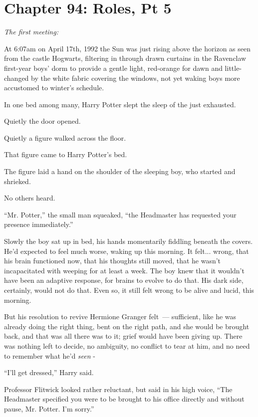 \chapter{Chapter 94: Roles, Pt 5}
\emph{The first meeting:}

At 6:07am on April 17th, 1992 the Sun was just rising above the horizon as seen from the castle Hogwarts, filtering in through drawn curtains in the Ravenclaw first-year boys' dorm to provide a gentle light, red-orange for dawn and little-changed by the white fabric covering the windows, not yet waking boys more accustomed to winter's schedule.

In one bed among many, Harry Potter slept the sleep of the just exhausted.

Quietly the door opened.

Quietly a figure walked across the floor.

That figure came to Harry Potter's bed.

The figure laid a hand on the shoulder of the sleeping boy, who started and shrieked.

No others heard.

``Mr. Potter,'' the small man squeaked, ``the Headmaster has requested your presence immediately.''

Slowly the boy sat up in bed, his hands momentarily fiddling beneath the covers. He'd expected to feel much worse, waking up this morning. It felt... wrong, that his brain functioned now, that his thoughts still moved, that he wasn't incapacitated with weeping for at least a week. The boy knew that it wouldn't have been an adaptive response, for brains to evolve to do that. His dark side, certainly, would not do that. Even so, it still felt wrong to be alive and lucid, this morning.

But his resolution to revive Hermione Granger felt~--- sufficient, like he was already doing the right thing, bent on the right path, and she would be brought back, and that was all there was to it; grief would have been giving up. There was nothing left to decide, no ambiguity, no conflict to tear at him, and no need to remember what he'd \emph{seen} -

``I'll get dressed,'' Harry said.

Professor Flitwick looked rather reluctant, but said in his high voice, ``The Headmaster specified you were to be brought to his office directly and without pause, Mr. Potter. I'm sorry.''

